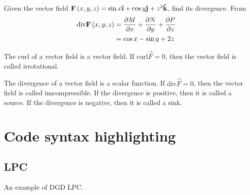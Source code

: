 \documentclass[openany]{memoir}
\begin{document}
\begin{mycode}
\begin{exmp}
Given the vector field $\nkvecfield{F}{x,y,z}=\sin x\ihat + \cos y\jhat + z^2\khat$,
find its divergence.
\nksolution
From 
\begin{align}
    \mathrm{div} \mathbf{F}\left(x,y,z\right)&=\frac{\partial M}{\partial x} + \frac{\partial N}{\partial y} + \frac{\partial P}{\partial z} \\
    &= \cos x - \sin y + 2z
\end{align}
\end{exmp}
\end{mycode}

\begin{nkremarkgood}
The curl of a vector field is a vector field.
If $\mathrm{curl}\vec{F}=0$, then the vector field is called irrotational.
\end{nkremarkgood}

\begin{nkremarkgood}
The divergence of a vector field is a scalar function.
If $\mathrm{div}\vec{F}=0$, then the vector field is called imcompressible.
If the divergence is positive, then it is called a source.
If the divergence is negative, then it is called a sink.
\end{nkremarkgood}

\chapter{Code syntax highlighting}

\section{LPC}

An example of DGD LPC.
\end{document}
